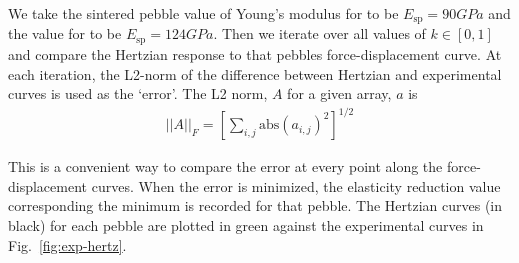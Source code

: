 We take the sintered pebble value of Young's modulus for \lis to be $E_\text{sp} = \si{90 GPa}$ and the value for \lit to be $E_\text{sp}= \si{124 GPa}$. Then we iterate over all values of $k\in[0,1]$ and compare the Hertzian response to that pebbles force-displacement curve. At each iteration, the L2-norm of the difference between Hertzian and experimental curves is used as the `error'. The L2 norm, $A$ for a given array, $a$ is 
\begin{align}
||A||_F = \left[\sum_{i,j}\textrm{abs}(a_{i,j})^2\right]^{1/2}
\end{align}

This is a convenient way to compare the error at every point along the force-displacement curves. When the error is minimized, the elasticity reduction value corresponding the minimum is recorded for that pebble. The Hertzian curves (in black) for each pebble are plotted in green against the experimental curves in Fig.~\ref{fig:exp-hertz}. 




